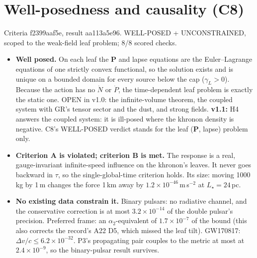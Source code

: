 \documentclass[10pt]{article}
\begin{document}
\section{Well-posedness and causality (C8)}
Criteria f2399aaf5e, result aa113a5e96. WELL-POSED + UNCONSTRAINED, scoped to the weak-field leaf problem; 8/8 scored checks.
\begin{itemize}
\item \textbf{Well posed.} On each leaf the $\mathbf P$ and lapse equations are the Euler--Lagrange equations of one strictly convex functional, so the solution exists and is unique on a bounded domain for every source below the cap ($\gamma_L>0$). Because the action has no $\dot N$ or $\dot P$, the time-dependent leaf problem is exactly the static one. OPEN in v1.0: the infinite-volume theorem, the coupled system with GR's tensor sector and the dust, and strong fields. \textbf{v1.1:} H4 answers the coupled system: it is ill-posed where the khronon density is negative. C8's WELL-POSED verdict stands for the leaf ($\mathbf P$, lapse) problem only.
\item \textbf{Criterion A is violated; criterion B is met.} The response is a real, gauge-invariant infinite-speed influence on the khronon's leaves. It never goes backward in $\tau$, so the single-global-time criterion holds. Its size: moving 1000\,kg by 1\,m changes the force 1\,km away by $1.2\times10^{-46}$\,m\,s$^{-2}$ at $L_\star=24$\,pc.
\item \textbf{No existing data constrain it.} Binary pulsars: no radiative channel, and the conservative correction is at most $3.2\times10^{-14}$ of the double pulsar's precision. Preferred frame: an $\alpha_2$-equivalent of $1.7\times10^{-7}$ of the bound (this also corrects the record's A22 D5, which missed the leaf tilt). GW170817: $\Delta v/c\le6.2\times10^{-32}$. P3's propagating pair couples to the metric at most at $2.4\times10^{-9}$, so the binary-pulsar result survives.
\end{itemize}
\end{document}
